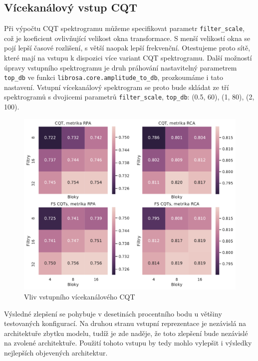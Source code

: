 \subsection{Vícekanálový vstup CQT}

Při výpočtu CQT spektrogramu můžeme specifikovat parametr \texttt{filter\_scale}, což je koeficient ovlivňující velikost okna transformace. S menší velikostí okna se pojí lepší časové rozlišení, s větší naopak lepší frekvenční. Otestujeme proto sítě, které mají na vstupu k dispozici více variant CQT spektrogramu. Další možností úpravy vstupního spektrogramu je druh práhování nastavitelný parametrem \texttt{top\_db} ve funkci \texttt{librosa.core.amplitude\_to\_db}, prozkoumáme i tato nastavení. Vstupní vícekanálový spektrogram se proto bude skládat ze tří spektrogramů s dvojicemi parametrů \texttt{filter\_scale}, \texttt{top\_db}: (0.5, 60), (1, 80), (2, 100).

\begin{figure}[h]\centering
    \includegraphics[scale=0.6]{../img/figures/spectrogram_fscqt}
\caption{Vliv vstupního vícekanálového CQT}\label{obr:spectrogram_fscqt}
\end{figure}

Výsledné zlepšení se pohybuje v desetinách procentního bodu u většiny testovaných konfigurací. Na druhou stranu vstupní reprezentace je nezávislá na architektuře zbytku modelu, tudíž je zde naděje, že toto zlepšení bude nezávislé na zvolené architektuře. Použití tohoto vstupu by tedy mohlo vylepšit i výsledky nejlepších objevených architektur.

